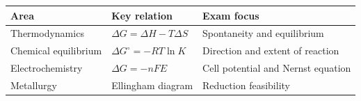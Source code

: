 \documentclass[12pt,a4paper]{article}
\begin{document}
\begin{tcolorbox}[tikzbox, title={Summary Reference Table}]
\begin{tabularx}{\linewidth}{|B{3cm}|Y|Y|}
\hline
\textbf{Area} & \textbf{Key relation} & \textbf{Exam focus} \\
\hline
Thermodynamics & $\Delta G=\Delta H-T\Delta S$ & Spontaneity and equilibrium \\
\hline
Chemical equilibrium & $\Delta G^\circ=-RT\ln K$ & Direction and extent of reaction \\
\hline
Electrochemistry & $\Delta G=-nFE$ & Cell potential and Nernst equation \\
\hline
Metallurgy & Ellingham diagram & Reduction feasibility \\
\hline
\end{tabularx}
\end{tcolorbox}
\end{document}
